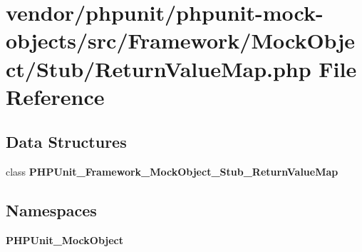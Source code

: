 \section{vendor/phpunit/phpunit-\/mock-\/objects/src/\+Framework/\+Mock\+Object/\+Stub/\+Return\+Value\+Map.php File Reference}
\label{_return_value_map_8php}
\subsection*{Data Structures}
\begin{DoxyCompactItemize}
\item 
class {\bf P\+H\+P\+Unit\+\_\+\+Framework\+\_\+\+Mock\+Object\+\_\+\+Stub\+\_\+\+Return\+Value\+Map}
\end{DoxyCompactItemize}
\subsection*{Namespaces}
\begin{DoxyCompactItemize}
\item 
 {\bf P\+H\+P\+Unit\+\_\+\+Mock\+Object}
\end{DoxyCompactItemize}
